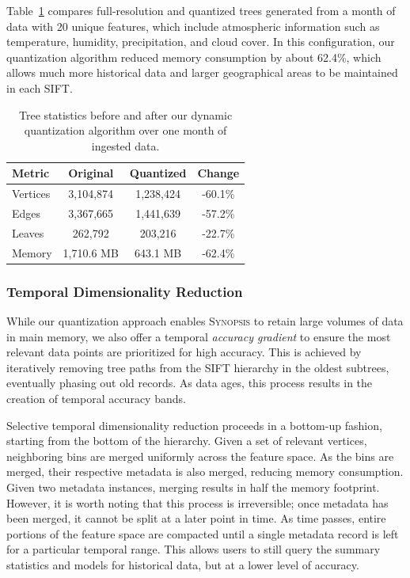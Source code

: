 Table~\ref{tbl:tree-stats} compares full-resolution and quantized trees generated from a month of data with 20 unique features, which include atmospheric information such as temperature, humidity, precipitation, and cloud cover. In this configuration, our quantization algorithm reduced memory consumption by about 62.4\%, which allows much more historical data and larger geographical areas to be maintained in each SIFT.
%
\begin{table}[h!]
    \renewcommand{\arraystretch}{1.2}
    \caption{Tree statistics before and after our dynamic quantization algorithm over one month of ingested data.\vspace{-1em}}
    \label{tbl:tree-stats}
    \begin{center}
        \begin{tabular}{|l|c|c|c|}
            \hline
            \textbf{Metric} & \textbf{Original} & \textbf{Quantized} & \textbf{Change} \\
            \hline
            Vertices & 3,104,874 & 1,238,424 & -60.1\% \\
            \hline
            Edges    & 3,367,665 & 1,441,639 & -57.2\% \\
            \hline
            Leaves   & 262,792   & 203,216   & -22.7\% \\
            \hline
            Memory   & 1,710.6 MB & 643.1 MB  & -62.4\% \\
            \hline
        \end{tabular}
    \end{center}
\end{table}

\vspace{-2em}

\subsubsection{Temporal Dimensionality Reduction}
While our quantization approach enables \textsc{Synopsis} to retain large volumes of data in main memory, we also offer a temporal \emph{accuracy gradient} to ensure the most relevant data points are prioritized for high accuracy. This is achieved by iteratively removing tree paths from the SIFT hierarchy in the oldest subtrees, eventually phasing out old records. As data ages, this process results in the creation of temporal accuracy bands.

Selective temporal dimensionality reduction proceeds in a bottom-up fashion, starting from the bottom of the hierarchy. Given a set of relevant vertices, neighboring bins are merged uniformly across the feature space. As the bins are merged, their respective metadata is also merged, reducing memory consumption. Given two metadata instances, merging results in half the memory footprint. However, it is worth noting that this process is irreversible; once metadata has been merged, it cannot be split at a later point in time. As time passes, entire portions of the feature space are compacted until a single metadata record is left for a particular temporal range. This allows users to still query the summary statistics and models for historical data, but at a lower level of accuracy.

